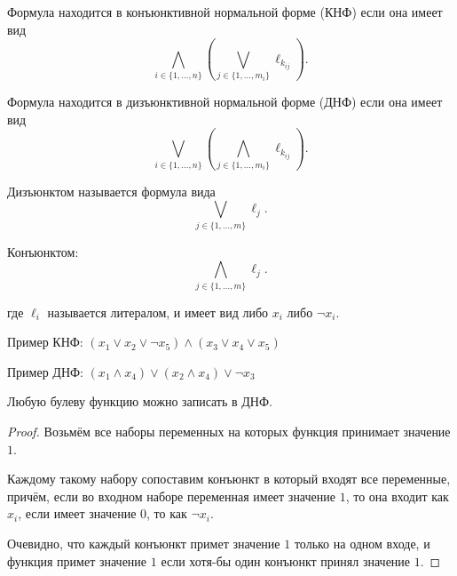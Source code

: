 
\begin{definition} \thmslashn 

    Формула находится в конъюнктивной нормальной форме (КНФ) если она имеет вид 
    \[ \bigwedge_{i\in \{1, \ldots, n\} } \left(\bigvee_{j\in \{1, \ldots, m_{i}\}} \ell_{k_{ij}}\right) .\]

    Формула находится в дизъюнктивной нормальной форме (ДНФ) если она имеет вид
    \[ \bigvee_{i\in \{1, \ldots, n\} } \left(\bigwedge_{j\in \{1, \ldots, m_{i}\}} \ell_{k_{ij}}\right) .\]

    Дизъюнктом называется формула вида
    \[ \bigvee_{j\in \{1, \ldots, m\} } \ell_{j} .\] 

    Конъюнктом:
    \[ \bigwedge_{j\in \{1, \ldots, m\} } \ell_{j} .\] 

    где $\ell_{i}$ называется литералом, и имеет вид либо $x_{i}$ либо $\neg x_{i}$.
        
\end{definition}

\begin{example} \thmslashn

    Пример КНФ: $(x_1 \lor x_2 \lor \neg x_5) \land (x_3 \lor x_4 \lor x_5)$

    Пример ДНФ: $(x_1 \land x_4) \lor (x_2 \land x_4) \lor \neg x_3$
\end{example}

\begin{theorem} \thmslashn

    Любую булеву функцию можно записать в ДНФ.

    \begin{proof} \thmslashn
    
        Возьмём все наборы переменных на которых функция принимает значение $1$.

        Каждому такому набору сопоставим конъюнкт в который входят все переменные, причём, если во входном наборе переменная имеет значение $1$, то она входит как $x_{i}$, если имеет значение $0$, то как $\neg x_{i}$.

        Очевидно, что каждый конъюнкт примет значение $1$ только на одном входе, и функция примет значение $1$ если хотя-бы один конъюнкт принял значение $1$.

    \end{proof}
\end{theorem}

